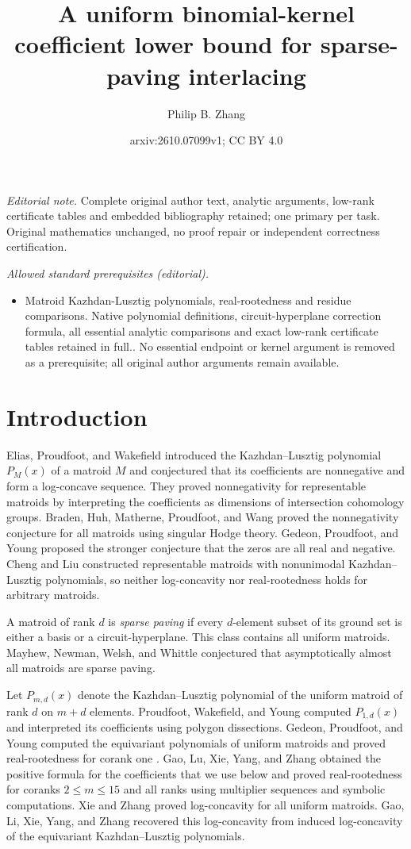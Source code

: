\documentclass[10pt,a4paper]{article}
\title{A uniform binomial-kernel coefficient lower bound for sparse-paving interlacing}
\author{Philip B. Zhang}
\date{arxiv:2610.07099v1; CC BY 4.0}
\numberwithin{equation}{section}
\theoremstyle{remark}\newtheorem{remark}[theorem]{Remark}
\begin{document}
\maketitle
\noindent\textit{Editorial note.} Complete original author text, analytic arguments, low-rank certificate tables and embedded bibliography retained; one primary per task. Original mathematics unchanged, no proof repair or independent correctness certification.\par\medskip
\noindent\textit{Allowed standard prerequisites (editorial).}\begin{itemize}
\item Matroid Kazhdan-Lusztig polynomials, real-rootedness and residue comparisons. Native polynomial definitions, circuit-hyperplane correction formula, all essential analytic comparisons and exact low-rank certificate tables retained in full.. No essential endpoint or kernel argument is removed as a prerequisite; all original author arguments remain available.
\end{itemize}\medskip
\section{Introduction}

Elias, Proudfoot, and Wakefield \cite{EPW} introduced the
Kazhdan--Lusztig polynomial $P_M(x)$ of a matroid $M$ and conjectured
that its coefficients are nonnegative and form a log-concave sequence.
They proved nonnegativity for representable matroids by interpreting the coefficients
as dimensions of intersection cohomology groups. Braden, Huh, Matherne, Proudfoot,
and Wang \cite{BHMPW} proved the nonnegativity conjecture for all matroids
using singular Hodge theory. Gedeon, Proudfoot, and Young
\cite{GPY} proposed the stronger conjecture that the
zeros are all real and negative. Cheng and Liu \cite{CL} constructed
representable matroids with nonunimodal Kazhdan--Lusztig polynomials,
so neither log-concavity nor real-rootedness holds for arbitrary
matroids.

A matroid of rank $d$ is \emph{sparse paving} if every $d$-element
subset of its ground set is either a basis or a circuit-hyperplane.
This class contains all uniform matroids. Mayhew, Newman, Welsh, and
Whittle \cite{MNWW} conjectured that asymptotically almost all matroids
are sparse paving.

Let $P_{m,d}(x)$ denote the
Kazhdan--Lusztig polynomial of the uniform matroid of rank $d$ on
$m+d$ elements. Proudfoot, Wakefield, and Young
\cite{PWY} computed $P_{1,d}(x)$ and interpreted its coefficients
using polygon dissections. Gedeon, Proudfoot, and Young
computed the equivariant polynomials of uniform matroids \cite{GPYeq}
and proved real-rootedness for corank one \cite[Theorem~3.3]{GPY}.
Gao, Lu, Xie, Yang, and
Zhang \cite{GLXYZ} obtained the positive formula for the coefficients that we use
below and proved real-rootedness for coranks $2\le m\le15$ and all
ranks using multiplier sequences and symbolic computations. Xie and Zhang \cite{XZ} proved
log-concavity for all uniform matroids. Gao, Li, Xie, Yang, and Zhang
\cite{GLiXYZ} recovered this log-concavity from induced log-concavity of
the equivariant Kazhdan--Lusztig polynomials.
\end{document}
